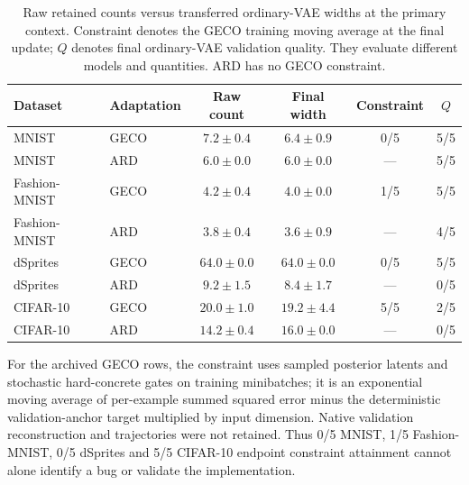 \documentclass[make,article,submit,pdftex,moreauthors]{Definitions/mdpi}
\begin{document}
\begin{table}[H]
\caption{Raw retained counts versus transferred ordinary-VAE widths at the primary context. Constraint denotes the GECO training moving average at the final update; $Q$ denotes final ordinary-VAE validation quality. They evaluate different models and quantities. ARD has no GECO constraint.}\label{tab:pruning}
\footnotesize
\setlength{\tabcolsep}{3.5pt}
\begin{tabular*}{\textwidth}{@{\extracolsep{\fill}}llcccc@{}}
\toprule
Dataset & Adaptation & Raw count & Final width & Constraint & $Q$ \\
\midrule
MNIST & GECO & $7.2 \pm 0.4$ & $6.4 \pm 0.9$ & 0/5 & 5/5 \\
MNIST & ARD & $6.0 \pm 0.0$ & $6.0 \pm 0.0$ & --- & 5/5 \\
Fashion-MNIST & GECO & $4.2 \pm 0.4$ & $4.0 \pm 0.0$ & 1/5 & 5/5 \\
Fashion-MNIST & ARD & $3.8 \pm 0.4$ & $3.6 \pm 0.9$ & --- & 4/5 \\
dSprites & GECO & $64.0 \pm 0.0$ & $64.0 \pm 0.0$ & 0/5 & 5/5 \\
dSprites & ARD & $9.2 \pm 1.5$ & $8.4 \pm 1.7$ & --- & 0/5 \\
CIFAR-10 & GECO & $20.0 \pm 1.0$ & $19.2 \pm 4.4$ & 5/5 & 2/5 \\
CIFAR-10 & ARD & $14.2 \pm 0.4$ & $16.0 \pm 0.0$ & --- & 0/5 \\
\bottomrule
\end{tabular*}
\end{table}


For the archived GECO rows, the constraint uses sampled posterior
latents and stochastic hard-concrete gates on training minibatches;
it is an exponential moving average of per-example summed squared
error minus the deterministic validation-anchor target multiplied by
input dimension. Native validation reconstruction and trajectories
were not retained. Thus 0/5 MNIST, 1/5 Fashion-MNIST, 0/5 dSprites and
5/5 CIFAR-10 endpoint constraint attainment cannot alone identify a
bug or validate the implementation.
\end{document}
